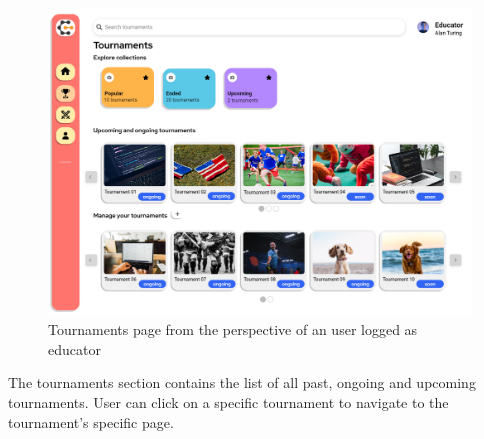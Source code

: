 \begin{figure}[H]
    \centering
    \includegraphics[width=1\textwidth]{Mockups/5_educator_tournaments.png}
    \caption{Tournaments page from the perspective of an user logged as educator}
\end{figure}
\newpage
\hfill \break
The tournaments section contains the list of all past, ongoing and upcoming tournaments. User can click on a specific tournament to navigate to the tournament's specific page. \\ \\ \\ \\ \\ \\

